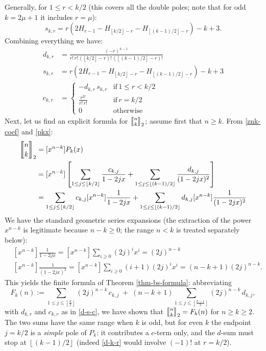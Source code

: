 \documentclass[a4paper]{amsart}
\numberwithin{equation}{section}
\newcommand{\mStirling}[0]{\genfrac{\llbracket}{\rrbracket}{0pt}{}}
\newcommand{\floor}[1]{\left\lfloor #1 \right\rfloor}
\begin{document}
Generally, for $1 \leq r < k/2$ (this covers all the double poles; note that for odd $k = 2\mu+1$ it includes $r = \mu$):
\begin{equation}\label{s-k}
    s_{k,r} = r(2H_{r-1}-H_{\floor{k/2}-r}-H_{\floor{(k-1)/2}-r})-k+3.
\end{equation}
Combining everything we have:
\begin{equation}\label{d-s-c}
    \begin{aligned}
        d_{k,r} &= \frac{(-r)^{k-1}}{r!\,r!\,(\floor{k/2}-r)!\,(\floor{(k-1)/2}-r)!} \\
        s_{k,r} &= r(2H_{r-1}-H_{\floor{k/2}-r}-H_{\floor{(k-1)/2}-r})-k+3 \\
        c_{k,r} &=
        \begin{cases}
            - d_{k,r}\, s_{k,r} & \text{if}\, 1 \leq r < k/2\\
            \frac{r^{2r}}{r!\,r!} & \text{if}\, r = k/2\\
            0 & \text{otherwise}
        \end{cases}
    \end{aligned}
\end{equation}
Next, let us find an explicit formula for $\mStirling{n}{k}_2$; assume first that $n \geq k$. From \eqref{znk-coef} and \eqref{pkx}:
\[
\begin{aligned}
    \mStirling{n}{k}_2 &=[x^{n-k}]P_k(x) \\
    &= [x^{n-k}]\left[ \sum_{1 \leq j \leq \floor{k/2}} \frac{c_{k,j}}{1-2jx} + \sum_{1 \leq j \leq \floor{(k-1)/2}} \frac{d_{k,j}}{(1-2jx)^2} \right]\\
     &= \sum_{1 \leq j \leq \floor{k/2}}c_{k,j}[x^{n-k}]  \frac{1}{1-2jx} + \sum_{1 \leq j \leq \floor{(k-1)/2}} d_{k,j}[x^{n-k}]\frac{1}{(1-2jx)^2} 
\end{aligned}
\]
We have the standard geometric series expansions (the extraction of the power $x^{n-k}$ is legitimate because $n - k \geq 0$; the range $n < k$ is treated separately below):
\[
\begin{aligned}
     & [x^{n-k}]\frac{1}{1-2jx} = [x^{n-k}]\sum_{i\geq0}(2j)^ix^i = (2j)^{n-k}\\
     & [x^{n-k}]\frac{1}{(1-2jx)^2} = [x^{n-k}]\sum_{i\geq0}(i+1)(2j)^ix^i = (n-k+1)(2j)^{n-k}.
\end{aligned}
\]
This yields the finite formula of Theorem \ref{thm-bs-formula}: abbreviating
\begin{equation}\label{z-d-c}
        F_k(n) := \sum_{1 \leq j \leq \floor{\frac{k}{2}}}(2j)^{n-k}\, c_{k,j} \;+\; (n-k+1)\sum_{1 \leq j \leq \floor{\frac{k-1}{2}}}(2j)^{n-k}\, d_{k,j},
\end{equation}
with $d_{k,r}$ and $c_{k,r}$ as in \eqref{d-s-c}, we have shown that $\mStirling{n}{k}_2 = F_k(n)$ for $n \geq k \geq 2$. The two sums have the same range when $k$ is odd, but for even $k$ the endpoint $j = k/2$ is a \emph{simple} pole of $P_k$: it contributes a $c$-term only, and the $d$-sum must stop at $\floor{(k-1)/2}$ (indeed \eqref{d-k-r} would involve $(-1)!$ at $r = k/2$).
\end{document}

